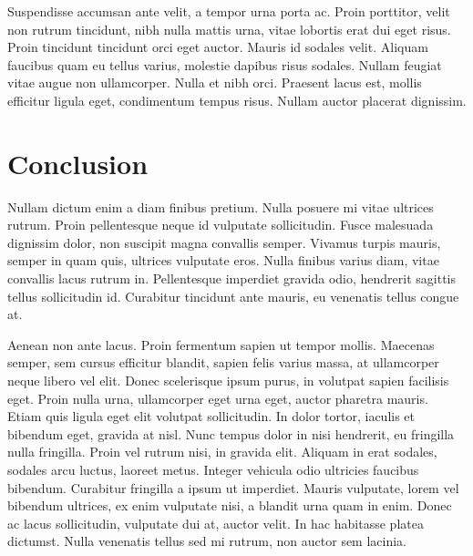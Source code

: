 \documentclass{article}
\begin{document}
Suspendisse accumsan ante velit, a tempor urna porta ac. Proin porttitor, velit non rutrum tincidunt, nibh nulla mattis urna, vitae lobortis erat dui eget risus. Proin tincidunt tincidunt orci eget auctor. Mauris id sodales velit. Aliquam faucibus quam eu tellus varius, molestie dapibus risus sodales. Nullam feugiat vitae augue non ullamcorper. Nulla et nibh orci. Praesent lacus est, mollis efficitur ligula eget, condimentum tempus risus. Nullam auctor placerat dignissim.

\section{Conclusion}

Nullam dictum enim a diam finibus pretium. Nulla posuere mi vitae ultrices rutrum. Proin pellentesque neque id vulputate sollicitudin. Fusce malesuada dignissim dolor, non suscipit magna convallis semper. Vivamus turpis mauris, semper in quam quis, ultrices vulputate eros. Nulla finibus varius diam, vitae convallis lacus rutrum in. Pellentesque imperdiet gravida odio, hendrerit sagittis tellus sollicitudin id. Curabitur tincidunt ante mauris, eu venenatis tellus congue at.

Aenean non ante lacus. Proin fermentum sapien ut tempor mollis. Maecenas semper, sem cursus efficitur blandit, sapien felis varius massa, at ullamcorper neque libero vel elit. Donec scelerisque ipsum purus, in volutpat sapien facilisis eget. Proin nulla urna, ullamcorper eget urna eget, auctor pharetra mauris. Etiam quis ligula eget elit volutpat sollicitudin. In dolor tortor, iaculis et bibendum eget, gravida at nisl. Nunc tempus dolor in nisi hendrerit, eu fringilla nulla fringilla. Proin vel rutrum nisi, in gravida elit. Aliquam in erat sodales, sodales arcu luctus, laoreet metus. Integer vehicula odio ultricies faucibus bibendum. Curabitur fringilla a ipsum ut imperdiet. Mauris vulputate, lorem vel bibendum ultrices, ex enim vulputate nisi, a blandit urna quam in enim. Donec ac lacus sollicitudin, vulputate dui at, auctor velit. In hac habitasse platea dictumst. Nulla venenatis tellus sed mi rutrum, non auctor sem lacinia.
\end{document}
